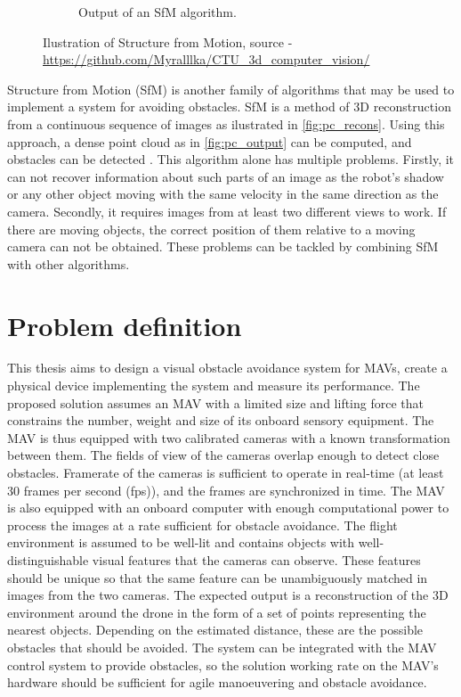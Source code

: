 \begin{figure}[h]
\begin{subfigure}[h]{0.65\textwidth}
      \caption{Output of an SfM algorithm.}
      \label{fig:pc_output}
    \end{subfigure}
    \caption[Ilustration of Structure from Motion.]{Ilustration of Structure from Motion, source - \url{https://github.com/Myralllka/CTU_3d_computer_vision/}}
    \label{fig:pc_recons}
\end{figure}

Structure from Motion (SfM) is another family of algorithms that may be used to implement a system for avoiding obstacles. 
SfM is a method of 3D reconstruction from a continuous sequence of images as ilustrated in \autoref{fig:pc_recons}.
Using this approach, a dense point cloud as in \autoref{fig:pc_output} can be computed, and obstacles can be detected \cite{Lee2008}. 
This algorithm alone has multiple problems.
Firstly, it can not recover information about such parts of an image as the robot's shadow or any other object moving with the same velocity in the same direction as the camera.
Secondly, it requires images from at least two different views to work.
If there are moving objects, the correct position of them relative to a moving camera can not be obtained.
These problems can be tackled by combining SfM with other algorithms.

\section{Problem definition}
\label{sec:problem_definition}
This thesis aims to design a visual obstacle avoidance system for MAVs, create a physical device implementing the system and measure its performance. 
The proposed solution assumes an MAV with a limited size and lifting force that constrains the number, weight and size of its onboard sensory equipment. 
The MAV is thus equipped with two calibrated cameras with a known transformation between them. 
The fields of view of the cameras overlap enough to detect close obstacles.
Framerate of the cameras is sufficient to operate in real-time (at least 30 frames per second (fps)), and the frames are synchronized in time.
The MAV is also equipped with an onboard computer with enough computational power to process the images at a rate sufficient for obstacle avoidance.
The flight environment is assumed to be well-lit and contains objects with well-distinguishable visual features that the cameras can observe.
These features should be unique so that the same feature can be unambiguously matched in images from the two cameras.
The expected output is a reconstruction of the 3D environment around the drone in the form of a set of points representing the nearest objects.
Depending on the estimated distance, these are the possible obstacles that should be avoided.
The system can be integrated with the MAV control system to provide obstacles, so the solution working rate on the MAV's hardware should be sufficient for agile manoeuvering and obstacle avoidance.


